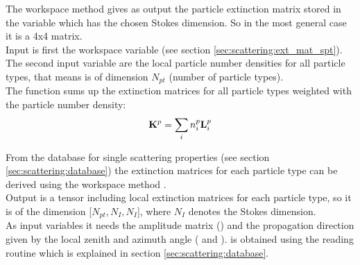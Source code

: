 The workspace method  gives as output the
particle extinction matrix  stored in the variable
 which has the chosen Stokes dimension. So in
the most general case it is a 4x4 matrix.\\
Input is first the workspace variable  (see section
\ref{sec:scattering:ext_mat_spt}). The second input variable are the
local particle number densities  for all particle types,
that means  is of dimension $N_{pt}$ (number of
particle types). \\
The function sums up the extinction matrices for all particle types
weighted with the particle number density:
\begin{eqnarray}
  {\bf K}^{p} = \sum_i n^p_i {\bf L}^{p}_i 
\end{eqnarray}


\label{sec:scattering:ext_mat_gas}

\label{sec:scattering:ext_mat_spt}

From the database for single scattering properties (see section 
\ref{sec:scattering:database}) the extinction matrices for each
particle type can be derived using the workspace method
.\\
Output is a tensor including local extinction matrices for each
particle type, so it is of the dimension [$N_{pt}, N_{I}, N_{I}$],
where $N_{I}$ denotes the Stokes dimension.\\

As input variables it needs the amplitude matrix ()
and the propagation direction given by the local zenith and azimuth
angle ( and ).  is
obtained using the reading routine  which is
explained in section \ref{sec:scattering:database}.\\

